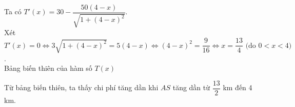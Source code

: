 \begin{ex}
{\begin{itemchoice}
			Ta có $T'(x)=30-\dfrac{50(4-x)}{\sqrt{1+(4-x)^2}}$. \\
			Xét $T'(x)=0\Leftrightarrow 3\sqrt{1+(4-x)^2}=5(4-x)\Leftrightarrow (4-x)^2=\dfrac{9}{16} \Leftrightarrow x=\dfrac{13}{4}\text { (do } 0<x<4)$. \\
			\itemch Bảng biến thiên của hàm số $T(x)$
			\begin{center}
			\end{center}
			Từ bảng biến thiên, ta thấy chi phí tăng dần khi $AS$ tăng dần từ $\dfrac{13}{2}$ km đến 4 km.
		\end{itemchoice}
		
	}
\end{ex}

